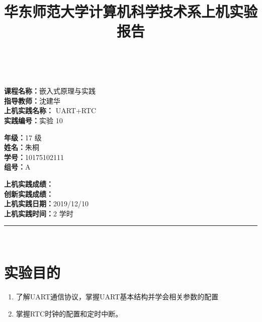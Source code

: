 \documentclass[a4paper,10pt,UTF8]{paper}
\title{华东师范大学计算机科学技术系上机实验报告}
\numberwithin{equation}{section}
\numberwithin{figure}{section}
\begin{document}
\pagestyle{fancy}
\lhead{}
\rhead{}
\makeatletter
\def\headrule{{\if@fancyplain\let\headrulewidth\plainheadrulewidth\fi%
\color{gray}\hrule\@height 0.2pt\@width\headwidth}
  \vspace{6mm}}
\makeatother

\newcommand{\HRule}{\rule{\linewidth}{1mm}}
\newcommand{\dai}{\textbf{Dais-CMX16$^+$}}

{ \\ [0.8cm]

\small{
  \begin{minipage}[t]{.32\linewidth}
    \textbf{课程名称：}嵌入式原理与实践\\
    \textbf{指导教师：}沈建华\\
    \textbf{上机实践名称：} UART+RTC\\
    \textbf{实践编号：}实验 10
  \end{minipage}
  \begin{minipage}[t]{.32\linewidth}
    \textbf{年级：}17 级\\
    \textbf{姓名：}朱桐\\
    \textbf{学号：}10175102111\\
    \textbf{组号：}A
  \end{minipage} 
  \begin{minipage}[t]{.32\linewidth}
    \textbf{上机实践成绩：} \\
    \textbf{创新实践成绩：} \\
    \textbf{上机实践日期：}2019/12/10\\
    \textbf{上机实践时间：}2 学时\\
  \end{minipage}
}
\HRule \\[0.5cm]
}



\section{实验目的}

\begin{enumerate}
    \item 了解UART通信协议，掌握UART基本结构并学会相关参数的配置
    \item 掌握RTC时钟的配置和定时中断。
\end{enumerate}
\end{document}
